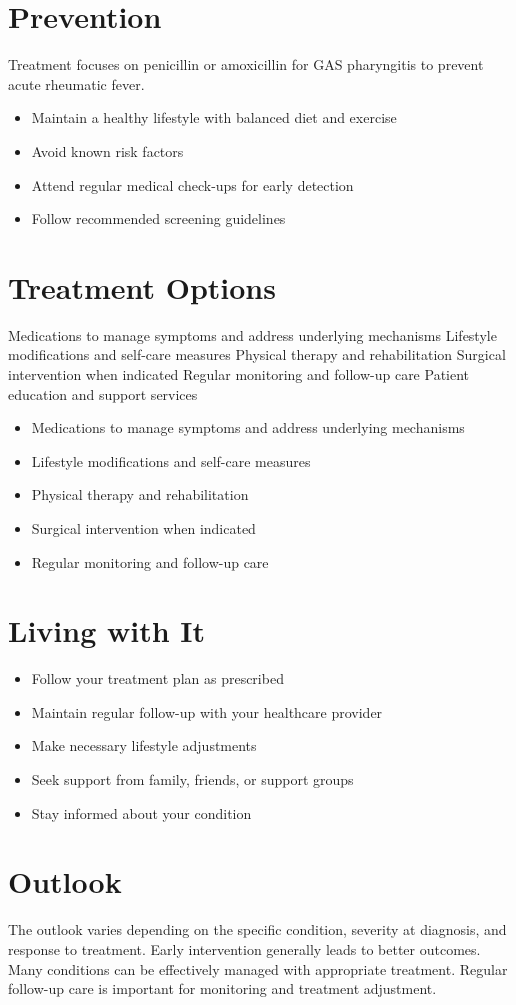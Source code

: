\section{Prevention}
Treatment focuses on penicillin or amoxicillin for GAS pharyngitis to prevent acute rheumatic fever.

\begin{itemize}[noitemsep]
  \item Maintain a healthy lifestyle with balanced diet and exercise
  \item Avoid known risk factors
  \item Attend regular medical check-ups for early detection
  \item Follow recommended screening guidelines
\end{itemize}
\section{Treatment Options}
Medications to manage symptoms and address underlying mechanisms Lifestyle modifications and self-care measures Physical therapy and rehabilitation Surgical intervention when indicated Regular monitoring and follow-up care Patient education and support services

\begin{itemize}[noitemsep]
  \item Medications to manage symptoms and address underlying mechanisms
  \item Lifestyle modifications and self-care measures
  \item Physical therapy and rehabilitation
  \item Surgical intervention when indicated
  \item Regular monitoring and follow-up care
\end{itemize}
\section{Living with It}
\begin{itemize}[noitemsep]
  \item Follow your treatment plan as prescribed
  \item Maintain regular follow-up with your healthcare provider
  \item Make necessary lifestyle adjustments
  \item Seek support from family, friends, or support groups
  \item Stay informed about your condition
\end{itemize}
\section{Outlook}
The outlook varies depending on the specific condition, severity at diagnosis, and response to treatment. Early intervention generally leads to better outcomes. Many conditions can be effectively managed with appropriate treatment. Regular follow-up care is important for monitoring and treatment adjustment.
